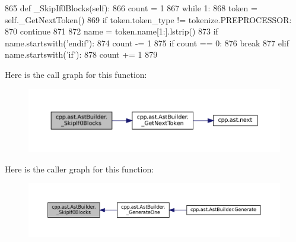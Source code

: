 \begin{DoxyCode}
865     \textcolor{keyword}{def }\_SkipIf0Blocks(self):
866         count = 1
867         \textcolor{keywordflow}{while} 1:
868             token = self.\_GetNextToken()
869             \textcolor{keywordflow}{if} token.token\_type != tokenize.PREPROCESSOR:
870                 \textcolor{keywordflow}{continue}
871 
872             name = token.name[1:].lstrip()
873             \textcolor{keywordflow}{if} name.startswith(\textcolor{stringliteral}{'endif'}):
874                 count -= 1
875                 \textcolor{keywordflow}{if} count == 0:
876                     \textcolor{keywordflow}{break}
877             \textcolor{keywordflow}{elif} name.startswith(\textcolor{stringliteral}{'if'}):
878                 count += 1
879 
\end{DoxyCode}
Here is the call graph for this function\+:
\nopagebreak
\begin{figure}[H]
\begin{center}
\leavevmode
\includegraphics[width=350pt]{classcpp_1_1ast_1_1AstBuilder_a2e872094ebb16513f608e1be21c41dd0_cgraph}
\end{center}
\end{figure}
Here is the caller graph for this function\+:
\nopagebreak
\begin{figure}[H]
\begin{center}
\leavevmode
\includegraphics[width=350pt]{classcpp_1_1ast_1_1AstBuilder_a2e872094ebb16513f608e1be21c41dd0_icgraph}
\end{center}
\end{figure}
\mbox{\label{classcpp_1_1ast_1_1AstBuilder_aebd0392eee56def849468af5b93b720a}} 
